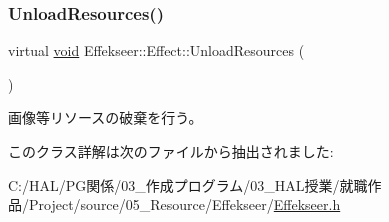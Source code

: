 \subsubsection{\texorpdfstring{Unload\+Resources()}{UnloadResources()}}
{\footnotesize\ttfamily virtual \mbox{\hyperlink{namespace_effekseer_ab34c4088e512200cf4c2716f168deb56}{void}} Effekseer\+::\+Effect\+::\+Unload\+Resources (\begin{DoxyParamCaption}{ }\end{DoxyParamCaption})\hspace{0.3cm}{\ttfamily [pure virtual]}}



画像等リソースの破棄を行う。 



このクラス詳解は次のファイルから抽出されました\+:\begin{DoxyCompactItemize}
\item 
C\+:/\+H\+A\+L/\+P\+G関係/03\+\_\+作成プログラム/03\+\_\+\+H\+A\+L授業/就職作品/\+Project/source/05\+\_\+\+Resource/\+Effekseer/\mbox{\hyperlink{_effekseer_8h}{Effekseer.\+h}}\end{DoxyCompactItemize}
